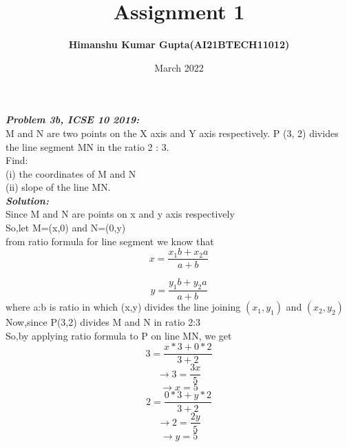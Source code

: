 \documentclass[journal,12pt,twocolumn]{IEEEtran}
\begin{document}
\title{Assignment 1}
\author{\textbf{Himanshu Kumar Gupta(AI21BTECH11012)}}
\date{March 2022}
\maketitle

\textbf{\textit{Problem 3b, ICSE 10 2019:}}\\

 M and N are two points on the X axis and Y axis respectively. 
P (3, 2) divides the line segment MN in the ratio 2 : 3.\\
Find:\\
(i)   the coordinates of M and N\\
(ii)  slope of the line MN.\\

\textbf{\textit{Solution:}}\\

Since M and N are points on x and y axis respectively\\
  So,let M=(x,0) and N=(0,y)\\
  
  from ratio formula for line segment we know that\\
  \begin{equation}
x=\frac{x_1b+x_2a}{a+b}
  \end{equation}
  
  \begin{equation}
  y=\frac{y_1b+y_2a}{a+b}
  \end{equation}
  where a:b is ratio in which (x,y) divides the line joining $(x_1,y_1)$ and $(x_2,y_2)$\\
  
Now,since P(3,2) divides M and N in ratio 2:3\\
So,by applying ratio formula to P on line MN, we get\\
\begin{equation*}
    3=\frac{x*3+0*2}{3+2}
\end{equation*}
\begin{equation*}
    \rightarrow3=\frac{3x}{5}
\end{equation*}
\begin{equation}
    \rightarrow x=5
\end{equation}
\begin{equation*}
    2=\frac{0*3+y*2}{3+2}
\end{equation*}
\begin{equation*}
    \rightarrow2=\frac{2y}{5}
\end{equation*}
\begin{equation}
    \rightarrow y=5
\end{equation}
\end{document}
